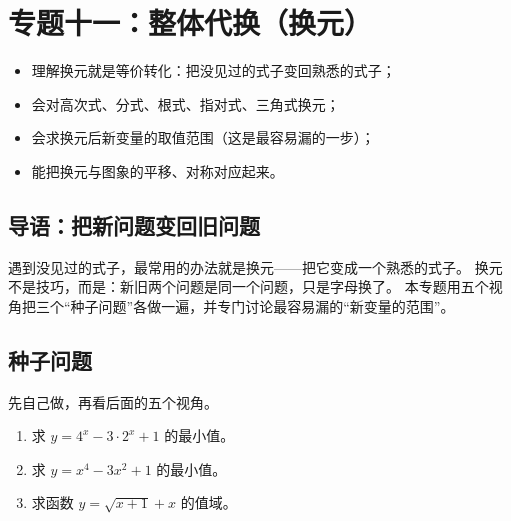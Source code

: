 \section{专题十一：整体代换（换元）}

\begin{learnobjective}
\begin{itemize}
  \item 理解换元就是等价转化：把没见过的式子变回熟悉的式子；
  \item 会对高次式、分式、根式、指对式、三角式换元；
  \item 会求换元后新变量的取值范围（这是最容易漏的一步）；
  \item 能把换元与图象的平移、对称对应起来。
\end{itemize}
\end{learnobjective}

\begin{preview}
\subsection{导语：把新问题变回旧问题}
遇到没见过的式子，最常用的办法就是换元——把它变成一个熟悉的式子。
换元不是技巧，而是：新旧两个问题是同一个问题，只是字母换了。
本专题用五个视角把三个“种子问题”各做一遍，并专门讨论最容易漏的“新变量的范围”。

\subsection{种子问题}
先自己做，再看后面的五个视角。
\begin{enumerate}
  \item 求 $y=4^x-3\cdot2^x+1$ 的最小值。
  \item 求 $y=x^4-3x^2+1$ 的最小值。
  \item 求函数 $y=\sqrt{x+1}+x$ 的值域。
\end{enumerate}
\end{preview}

